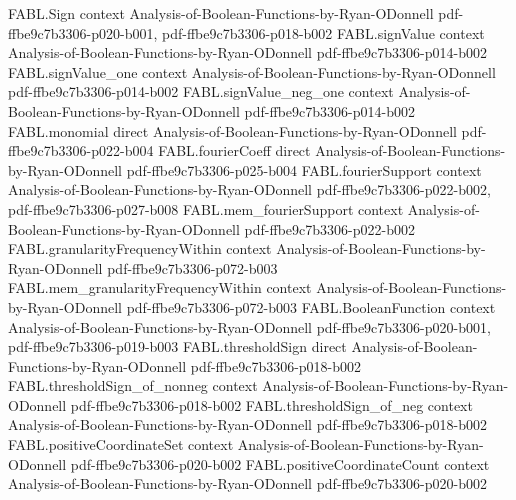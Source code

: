 \begin{theorem}
\label{FABL.totalInfluence_eq_expect_sum_sq_discreteDerivative}
\leanok
{}
\proofstep
  {FABL.Sign}
  {context}
  {Analysis-of-Boolean-Functions-by-Ryan-ODonnell}
  {pdf-ffbe9c7b3306-p020-b001,
    pdf-ffbe9c7b3306-p018-b002}
\proofstep
  {FABL.signValue}
  {context}
  {Analysis-of-Boolean-Functions-by-Ryan-ODonnell}
  {pdf-ffbe9c7b3306-p014-b002}
\proofstep
  {FABL.signValue_one}
  {context}
  {Analysis-of-Boolean-Functions-by-Ryan-ODonnell}
  {pdf-ffbe9c7b3306-p014-b002}
\proofstep
  {FABL.signValue_neg_one}
  {context}
  {Analysis-of-Boolean-Functions-by-Ryan-ODonnell}
  {pdf-ffbe9c7b3306-p014-b002}
\proofstep
  {FABL.monomial}
  {direct}
  {Analysis-of-Boolean-Functions-by-Ryan-ODonnell}
  {pdf-ffbe9c7b3306-p022-b004}
\proofstep
  {FABL.fourierCoeff}
  {direct}
  {Analysis-of-Boolean-Functions-by-Ryan-ODonnell}
  {pdf-ffbe9c7b3306-p025-b004}
\proofstep
  {FABL.fourierSupport}
  {context}
  {Analysis-of-Boolean-Functions-by-Ryan-ODonnell}
  {pdf-ffbe9c7b3306-p022-b002,
    pdf-ffbe9c7b3306-p027-b008}
\proofstep
  {FABL.mem_fourierSupport}
  {context}
  {Analysis-of-Boolean-Functions-by-Ryan-ODonnell}
  {pdf-ffbe9c7b3306-p022-b002}
\proofstep
  {FABL.granularityFrequencyWithin}
  {context}
  {Analysis-of-Boolean-Functions-by-Ryan-ODonnell}
  {pdf-ffbe9c7b3306-p072-b003}
\proofstep
  {FABL.mem_granularityFrequencyWithin}
  {context}
  {Analysis-of-Boolean-Functions-by-Ryan-ODonnell}
  {pdf-ffbe9c7b3306-p072-b003}
\proofstep
  {FABL.BooleanFunction}
  {context}
  {Analysis-of-Boolean-Functions-by-Ryan-ODonnell}
  {pdf-ffbe9c7b3306-p020-b001,
    pdf-ffbe9c7b3306-p019-b003}
\proofstep
  {FABL.thresholdSign}
  {direct}
  {Analysis-of-Boolean-Functions-by-Ryan-ODonnell}
  {pdf-ffbe9c7b3306-p018-b002}
\proofstep
  {FABL.thresholdSign_of_nonneg}
  {context}
  {Analysis-of-Boolean-Functions-by-Ryan-ODonnell}
  {pdf-ffbe9c7b3306-p018-b002}
\proofstep
  {FABL.thresholdSign_of_neg}
  {context}
  {Analysis-of-Boolean-Functions-by-Ryan-ODonnell}
  {pdf-ffbe9c7b3306-p018-b002}
\proofstep
  {FABL.positiveCoordinateSet}
  {context}
  {Analysis-of-Boolean-Functions-by-Ryan-ODonnell}
  {pdf-ffbe9c7b3306-p020-b002}
\proofstep
  {FABL.positiveCoordinateCount}
  {context}
  {Analysis-of-Boolean-Functions-by-Ryan-ODonnell}
  {pdf-ffbe9c7b3306-p020-b002}

\end{theorem}
